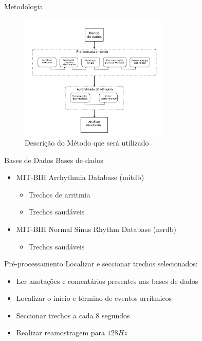 \documentclass[10pt]{beamer}
\begin{document}
\begin{frame}{Metodologia}
  \begin{figure}[]
    \centering
    \includegraphics[height=6cm]{images/proposal.png}
    \caption{Descrição do Método que será utilizado}
  \end{figure}
\end{frame}

\begin{frame}{Bases de Dados}
  Bases de dados
  \begin{itemize}
    \item MIT-BIH Arrhythmia Database (mitdb)
    \begin{itemize}
      \item Trechos de arritmia
      \item Trechos saudáveis 
    \end{itemize}

    \item MIT-BIH Normal Sinus Rhythm Database (nsrdb)
    \begin{itemize}
      \item Trechos saudáveis
    \end{itemize}
  \end{itemize}
\end{frame}

\begin{frame}{Pré-processamento}
  Localizar e seccionar trechos selecionados:
  \begin{itemize}
    \item Ler anotações e comentários presentes nas bases de dados
    \item Localizar o início e término de eventos arrítmicos
    \item Seccionar trechos a cada 8 segundos
    \item Realizar reamostragem para $128 Hz$
  \end{itemize}
\end{frame}
\end{document}
